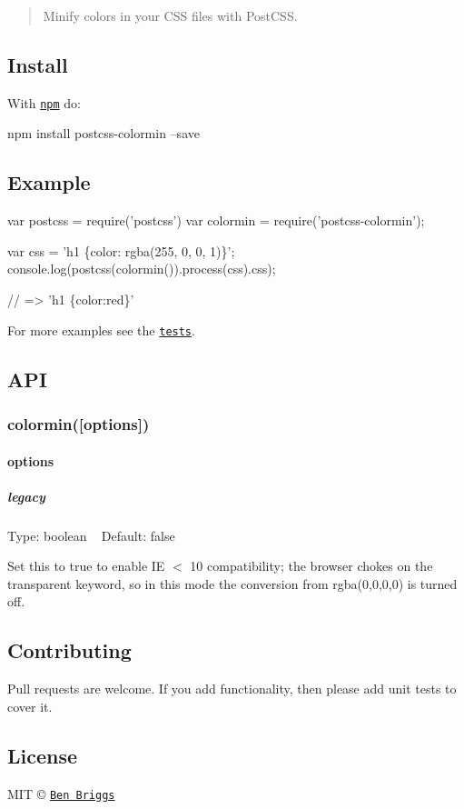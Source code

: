 \begin{quote}
Minify colors in your C\+SS files with Post\+C\+SS. \end{quote}


\subsection*{Install}

With \href{https://npmjs.org/package/postcss-colormin}{\tt npm} do\+:


\begin{DoxyCode}
npm install postcss-colormin --save
\end{DoxyCode}


\subsection*{Example}


\begin{DoxyCode}
var postcss = require('postcss')
var colormin = require('postcss-colormin');

var css = 'h1 \{color: rgba(255, 0, 0, 1)\}';
console.log(postcss(colormin()).process(css).css);

// => 'h1 \{color:red\}'
\end{DoxyCode}


For more examples see the \href{src/__tests__/index.js}{\tt tests}.

\subsection*{A\+PI}

\subsubsection*{colormin(\mbox{[}options\mbox{]})}

\paragraph*{options}

\subparagraph*{legacy}

Type\+: {\ttfamily boolean} ~\newline
Default\+: {\ttfamily false}

Set this to {\ttfamily true} to enable IE $<$ 10 compatibility; the browser chokes on the {\ttfamily transparent} keyword, so in this mode the conversion from {\ttfamily rgba(0,0,0,0)} is turned off.

\subsection*{Contributing}

Pull requests are welcome. If you add functionality, then please add unit tests to cover it.

\subsection*{License}

M\+IT © \href{http://beneb.info}{\tt Ben Briggs} 